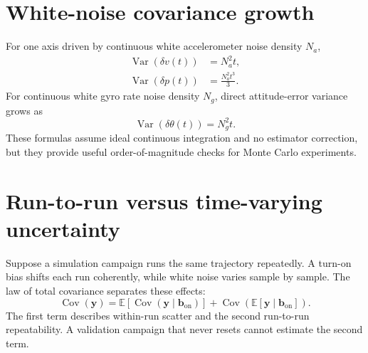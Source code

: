 \documentclass[11pt,oneside,headings=big]{scrreprt}
\newcommand{\E}{\mathbb{E}}
\newcommand{\Cov}{\operatorname{Cov}}
\newcommand{\Var}{\operatorname{Var}}
\newcommand{\vect}[1]{\bm{#1}}
\begin{document}
    \section{White-noise covariance growth}
    For one axis driven by continuous white accelerometer noise density \(N_a\),
    \begin{align}
        \Var(\delta v(t))&=N_a^2t,\\
        \Var(\delta p(t))&=\frac{N_a^2t^3}{3}.
        \label{eq:accel-white-growth}
    \end{align}
    For continuous white gyro rate noise density \(N_g\), direct attitude-error
    variance grows as
    \begin{equation}
        \Var(\delta\theta(t))=N_g^2t.
        \label{eq:gyro-white-growth}
    \end{equation}
    These formulas assume ideal continuous integration and no estimator correction,
    but they provide useful order-of-magnitude checks for Monte Carlo experiments.


    \section{Run-to-run versus time-varying uncertainty}
    Suppose a simulation campaign runs the same trajectory repeatedly. A turn-on
    bias shifts each run coherently, while white noise varies sample by sample. The
    law of total covariance separates these effects:
    \begin{equation}
        \Cov(\vect y)
        =\E\!\left[\Cov(\vect y\mid\vect b_{\mathrm{on}})\right]
        +\Cov\!\left(\E[\vect y\mid\vect b_{\mathrm{on}}]\right).
        \label{eq:total-covariance}
    \end{equation}
    The first term describes within-run scatter and the second run-to-run
    repeatability. A validation campaign that never resets cannot estimate the
    second term.
\end{document}
